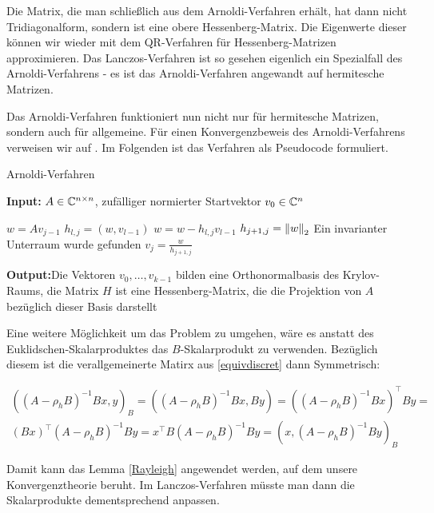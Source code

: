 \documentclass{article}
\theoremstyle{plain}
\begin{document}
Die Matrix, die man schließlich aus dem Arnoldi-Verfahren erhält, hat dann nicht Tridiagonalform, sondern ist eine obere Hessenberg-Matrix. Die Eigenwerte dieser können wir wieder mit dem QR-Verfahren für Hessenberg-Matrizen approximieren.
Das Lanczos-Verfahren ist so gesehen eigenlich ein Spezialfall des Arnoldi-Verfahrens - es ist das Arnoldi-Verfahren angewandt auf hermitesche Matrizen.

Das Arnoldi-Verfahren funktioniert nun nicht nur für hermitesche Matrizen, sondern auch für allgemeine. Für einen Konvergenzbeweis des Arnoldi-Verfahrens verweisen wir auf \cite{Saad_book}. Im Folgenden ist das Verfahren als Pseudocode formuliert.

\renewcommand{\algorithmicrequire}{\textbf{Input:}}
\renewcommand{\algorithmicensure}{\textbf{Output:}}

\begin{algorithm}[H]

	\caption{Arnoldi-Verfahren}
	\label{Arnoldi-Verfahren}
	\algorithmicrequire{ $A \in \C^{n\times n}$, zufälliger normierter Startvektor $v_0 \in \C^n$}
	\begin{algorithmic}[1]
			\State $w = A v_{j-1}$
				\State $h_{l,j} = (w, v_{l-1})$
				\State $w = w - h_{l,j}v_{l-1}$
			\EndFor
			\State $h_{j+1,j} = \norm[2]{w}$
			\State Ein invarianter Unterraum wurde gefunden
			\Else
				\State $v_j = \frac{w}{h_{j+1,j}}$
			\EndIf
		\EndFor
	\end{algorithmic}
	\algorithmicensure{Die Vektoren $v_0,\dots,v_{k-1}$ bilden eine Orthonormalbasis des Krylov-Raums, die Matrix $H$ ist eine Hessenberg-Matrix, die die Projektion von $A$ bezüglich dieser Basis darstellt}
\end{algorithm}

Eine weitere Möglichkeit um das Problem zu umgehen, wäre es anstatt des Euklidschen-Skalarproduktes das $B$-Skalarprodukt zu verwenden. Bezüglich diesem ist die verallgemeinerte Matirx aus \eqref{equivdiscret} dann Symmetrisch:

\begin{align*}
	((A - \rho_h B)^{-1} Bx, y)_B =
	((A - \rho_h B)^{-1} Bx, By) =
	((A - \rho_h B)^{-1} Bx)^\top By = \\
	(Bx)^\top (A - \rho_h B)^{-1}By =
	x^\top B(A - \rho_h B)^{-1}By =
	(x,(A - \rho_h B)^{-1}By)_B
\end{align*}

Damit kann das Lemma \ref{Rayleigh} angewendet werden, auf dem unsere Konvergenztheorie beruht. Im Lanczos-Verfahren müsste man dann die Skalarprodukte dementsprechend anpassen.
\end{document}
